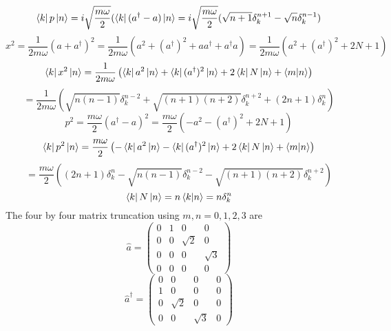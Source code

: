 \begin{sol}
\begin{enumerate}[label=\textbf{(\alph*)}]
\begin{equation}
	\bra kp\ket n=i\sqrt{\frac{m\omega}{2}}(\bra k(a^\dagger-a)\ket n=i\sqrt{\frac{m\omega}{2}}(\sqrt{n+1}\delta_k^{n+1}-\sqrt n\delta_k^{n-1})
\end{equation}
\begin{equation}
	x^2=\frac{1}{2m\omega}(a+a^\dagger)^2=\frac{1}{2m\omega}(a^2+(a^\dagger)^2+aa^\dagger+a^\dagger a)=\frac{1}{2m\omega}(a^2+(a^\dagger)^2+2N+1)
\end{equation}
\begin{equation}
	\bra kx^2\ket n=\frac{1}{2m\omega}\left(\bra ka^2\ket n+\bra k(a^\dagger)^2\ket n+2\bra kN\ket n+\braket{m}{n}\right)
\end{equation}
\begin{equation}
	=\frac{1}{2m\omega}\left(\sqrt{n(n-1)}\delta_k^{n-2}+\sqrt{(n+1)(n+2)}\delta_k^{n+2}+(2n+1)\delta_k^n\right)
\end{equation} 
\begin{equation}
	p^2=\frac{m\omega}{2}(a^\dagger-a)^2=\frac{m\omega}{2}(-a^2-(a^\dagger)^2+2N+1)
\end{equation}
\begin{equation}
	\bra kp^2\ket n=\frac{m\omega}{2}\left(-\bra ka^2\ket n-\bra k(a^\dagger)^2\ket n+2\bra kN\ket n+\braket{m}{n}\right)
\end{equation}
\begin{equation}
	=\frac{m\omega}{2}\left((2n+1)\delta_k^n-\sqrt{n(n-1)}\delta_k^{n-2}-\sqrt{(n+1)(n+2)}\delta_k^{n+2}\right)
\end{equation}
\begin{equation}
	\bra kN\ket n=n\braket{k}{n}=n\delta_k^n
\end{equation} 
The four by four matrix truncation using $m,n=0,1,2,3$ are 
\begin{equation}
	\hat a=\begin{pmatrix}
0&1&0&0\\0&0&\sqrt{2}&0\\0&0&0&\sqrt{3}\\0&0&0&0
\end{pmatrix}
\end{equation} \begin{equation}
	\hat a^\dagger=\begin{pmatrix}
0&0&0&0\\1&0&0&0\\0&\sqrt{2}&0&0\\0&0&\sqrt{3}&0
\end{pmatrix}
\end{equation}

\end{enumerate}
\end{sol}
